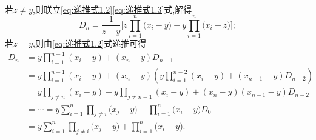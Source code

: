 \documentclass[../../main.tex]{subfiles}%
\begin{document}
\begin{solution}
\begin{align}
\label{eq:递推式1.3}
\end{align}
若$z\ne y$,则联立\eqref{eq:递推式1.2}\eqref{eq:递推式1.3}式,解得
\begin{equation}
D_n=\frac{1}{z-y}\biggl[ z\prod\limits_{i=1}^n{(x_i}-y)-y\prod\limits_{i=1}^n{(x_i}-z) \biggr];
\nonumber
\end{equation}
若$z= y$,则由\eqref{eq:递推式1.2}式递推可得
\begin{equation}
\begin{split}
D_n&=y\prod\limits_{i=1}^{n-1}{\left( x_i-y \right)}+\left( x_n-y \right) D_{n-1}
\\
&=y\prod\limits_{i=1}^{n-1}{\left( x_i-y \right)}+\left( x_n-y \right) \left( y\prod\limits_{i=1}^{n-2}{\left( x_i-y \right)}+\left( x_{n-1}-y \right) D_{n-2} \right) 
\\
&=y\prod\limits_{j\ne n}^{}{\left( x_i-y \right)}+y\prod\limits_{j\ne n-1}^{}{\left( x_i-y \right)}+\left( x_n-y \right) \left( x_{n-1}-y \right) D_{n-2}
\\
&=\cdots =y\sum_{i=1}^n{\prod\limits_{j\ne i}{(x_j}}-y)+\prod\limits_{i=1}^n{(x_i}-y)D_0
\\
&=y\sum_{i=1}^n{\prod\limits_{j\ne i}{(x_j}}-y)+\prod\limits_{i=1}^n{(x_i}-y).
\end{split}
\nonumber
\end{equation}


\end{solution}
\end{document}
